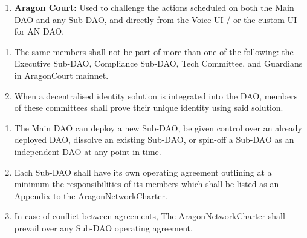 \begin{enumerate}
\begin{enumerate}
\begin{enumerate}
		\end{enumerate}
		
		\item \textbf{Aragon Court:} Used to challenge the actions scheduled on both the Main \ac{DAO} and any Sub-\ac{DAO}, and directly from the Voice UI / or the custom UI for AN \ac{DAO}.
	\end{enumerate}
	
	\begin{enumerate}
		\item The same members shall not be part of more than one of the following: the Executive Sub-\ac{DAO}, Compliance Sub-\ac{DAO}, Tech Committee, and Guardians in \gls{AragonCourt} mainnet.
		\item When a decentralised identity solution is integrated into the \ac{DAO}, members of these committees shall prove their unique identity using said solution.
	\end{enumerate}


	\begin{enumerate}
		\item The Main \ac{DAO} can deploy a new Sub-\ac{DAO}, be given control over an already deployed \ac{DAO}, dissolve an existing Sub-\ac{DAO}, or spin-off a Sub-\ac{DAO} as an independent \ac{DAO} at any point in time.
		\item Each Sub-\ac{DAO} shall have its own operating agreement outlining at a minimum the responsibilities of its members which shall be listed as an Appendix to the \gls{AragonNetworkCharter}.
		\item In case of conflict between agreements, The \gls{AragonNetworkCharter} shall prevail over any Sub-\ac{DAO} operating agreement.
	\end{enumerate}


\end{enumerate}
